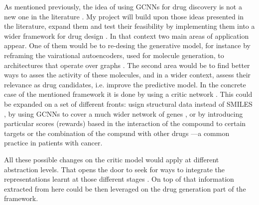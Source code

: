 \documentclass{article}
\begin{document}
As mentioned previously, the idea of using GCNNs for drug discovery is not a new one in
the literature \cite{Sun2019}. My project will build upon those ideas presented in the
literature, expand them and test their feasibility by implementing them into a wider
framework for drug design \cite{Born2019}. In that context two main areas of application
appear. One of them would be to re-desing the generative model, for instance by
reframing the vairational autoencoders, used for molecule generation, to architectures
that operate over graphs \cite{Simonovsky2018,Li2018,Li2018a}. The second area would be
to find better ways to asses the activity of these molecules, and in a wider context,
assess their relevance as drug candidates, i.e. improve the predictive model. In the
concrete case of the mentioned framework it is done by using a critic network
\cite{Manica2019}. This could be expanded on a set of different fronts: usign structural
data instead of SMILES \cite{Li,Do2019}, by using GCNNs to cover a much wider network of
genes \cite{Oskooei2019, Wang2019}, or by introducing particular scores (rewards) based
in the interaction of the compound to certain targets \cite{YingkaiGao2018,
Zhavoronkov2019} or the combination of the compund with other drugs
\cite{Zitnik2018}---a common practice in patients with cancer.

All these possible changes on the critic model would apply at different abstraction
levels. That opens the door to seek for ways to integrate the representations learnt at
those different stages \cite{Ying2018, Ma2019, Huang2019}. On top of that information
extracted from here could be then leveraged on the drug generation part of the
framework.









    
\end{document}
